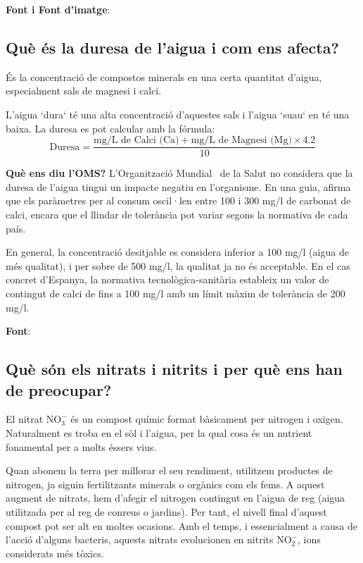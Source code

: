 \textbf{Font i Font d'imatge}: \cite{PH}

\subsection{Què és la duresa de l’aigua i com ens afecta?} \label{subsec:duresa}
És la concentració de compostos minerals en una certa quantitat d'aigua, especialment sals de magnesi i calci.

L'aigua `dura` té una alta concentració d'aquestes sals i l'aigua `suau` en té una baixa. La duresa es pot calcular amb la fórmula:
\[
\text{Duresa} = \frac{\text{mg/L de Calci (Ca)} + \text{mg/L de Magnesi (Mg)} \times 4.2}{10}
\]


\textbf{Què ens diu l'OMS?} L'Organització Mundial~\cite{OrgaMS} de la Salut no considera que la duresa de l'aigua tingui un impacte negatiu en l'organisme. En una guia, afirma que els paràmetres per al consum oscil·len entre 100 i 300 mg/l de carbonat de calci, encara que el llindar de tolerància pot variar segons la normativa de cada país.

En general, la concentració desitjable es considera inferior a 100 mg/l (aigua de més qualitat), i per sobre de 500 mg/l, la qualitat ja no és acceptable. En el cas concret d'Espanya, la normativa tecnològica-sanitària estableix un valor de contingut de calci de fins a 100 mg/l amb un límit màxim de tolerància de 200 mg/l.

\textbf{Font}: \cite{Fasca}

\subsection{Què són els nitrats i nitrits i per què ens han de preocupar?} \label{subsec:nitratsnitrits}
El nitrat \(\mathrm{NO_3^-}\) és un compost químic format bàsicament per nitrogen i oxigen. Naturalment es troba en el sòl i l'aigua, per la qual cosa és un nutrient fonamental per a molts éssers vius.

Quan abonem la terra per millorar el seu rendiment, utilitzem productes de nitrogen, ja siguin fertilitzants minerals o orgànics com els fems. A aquest augment de nitrats, hem d'afegir el nitrogen contingut en l'aigua de reg (aigua utilitzada per al reg de conreus o jardins). Per tant, el nivell final d'aquest compost pot ser alt en moltes ocasions. Amb el temps, i essencialment a causa de l'acció d'alguns bacteris, aquests nitrats evolucionen en nitrits \(\mathrm{NO_2^-}\), ions considerats més tòxics.

